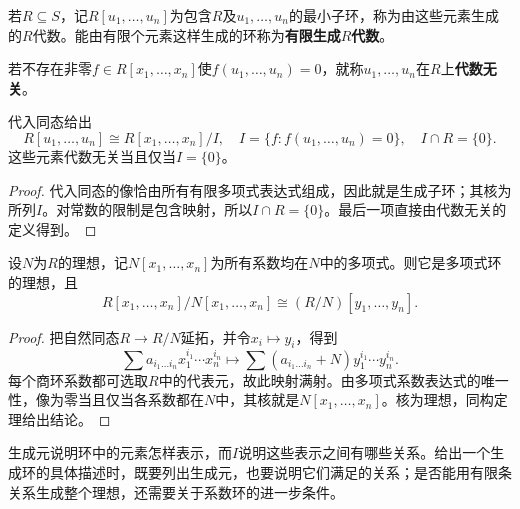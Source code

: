 \begin{definition}
若$R\subseteq S$，记$R[u_1,\ldots,u_n]$为包含$R$及$u_1,\ldots,u_n$的最小子环，称为由这些元素生成的$R$代数。能由有限个元素这样生成的环称为\textbf{有限生成$R$代数}。

若不存在非零$f\in R[x_1,\ldots,x_n]$使$f(u_1,\ldots,u_n)=0$，就称$u_1,\ldots,u_n$在$R$上\textbf{代数无关}。
\end{definition}

\begin{corollary}
代入同态给出
\[
R[u_1,\ldots,u_n]\cong R[x_1,\ldots,x_n]/I,
\quad I=\{f:f(u_1,\ldots,u_n)=0\},\quad I\cap R=\{0\}.
\]
这些元素代数无关当且仅当$I=\{0\}$。
\end{corollary}
\begin{proof}
代入同态的像恰由所有有限多项式表达式组成，因此就是生成子环；其核为所列$I$。对常数的限制是包含映射，所以$I\cap R=\{0\}$。最后一项直接由代数无关的定义得到。
\end{proof}

\begin{proposition}
设$N$为$R$的理想，记$N[x_1,\ldots,x_n]$为所有系数均在$N$中的多项式。则它是多项式环的理想，且
\[
R[x_1,\ldots,x_n]/N[x_1,\ldots,x_n]
\cong(R/N)[y_1,\ldots,y_n].
\]
\end{proposition}
\begin{proof}
把自然同态$R\to R/N$延拓，并令$x_i\mapsto y_i$，得到
\[
\sum a_{i_1\ldots i_n}x_1^{i_1}\cdots x_n^{i_n}
\longmapsto
\sum(a_{i_1\ldots i_n}+N)y_1^{i_1}\cdots y_n^{i_n}.
\]
每个商环系数都可选取$R$中的代表元，故此映射满射。由多项式系数表达式的唯一性，像为零当且仅当各系数都在$N$中，其核就是$N[x_1,\ldots,x_n]$。核为理想，同构定理给出结论。
\end{proof}

生成元说明环中的元素怎样表示，而$I$说明这些表示之间有哪些关系。给出一个生成环的具体描述时，既要列出生成元，也要说明它们满足的关系；是否能用有限条关系生成整个理想，还需要关于系数环的进一步条件。
